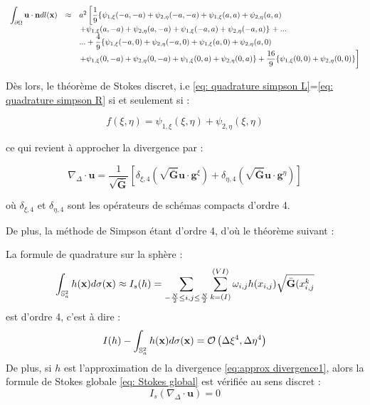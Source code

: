 \begin{equation}
\begin{array}{rcl}
\displaystyle\int_{\partial \Omega} \mathbf{u} \cdot \mathbf{n} dl(\mathbf{x}) & \approx &  a^2 \left[ \dfrac{1}{9} \lbrace  \psi_{1,\xi}(-a,-a)+\psi_{2,\eta}(-a,-a)+\psi_{1,\xi}(a,a)+\psi_{2,\eta}(a,a) \right. \\
& & \left. +\psi_{1,\xi}(a,-a)+\psi_{2,\eta}(a,-a)+\psi_{1,\xi}(-a,a)+\psi_{2,\eta}(-a,a)  \rbrace \right. + ...\\
& & ...+ \dfrac{4}{9} \lbrace  \psi_{1,\xi}(-a,0)+\psi_{2,\eta}(-a,0)+\psi_{1,\xi}(a,0)+\psi_{2,\eta}(a,0) \\
& & \left. +\psi_{1,\xi}(0,-a)+\psi_{2,\eta}(0,-a)+\psi_{1,\xi}(0,a)+\psi_{2,\eta}(0,a)   \rbrace + \dfrac{16}{9} \lbrace \psi_{1,\xi}(0,0)+\psi_{2,\eta}(0,0) \rbrace \right]
\end{array}
\label{eq: quadrature simpson R}
\end{equation}

Dès lors, le théorème de Stokes discret, i.e \eqref{eq: quadrature simpson L}=\eqref{eq: quadrature simpson R} si et seulement si :

\begin{equation}
f(\xi,\eta) = \psi_{1,\xi}(\xi,\eta)+\psi_{2,\eta}(\xi,\eta)
\end{equation}

ce qui revient à approcher la divergence par :

\begin{equation}
\nabla_{\Delta} \cdot \mathbf{u} =\dfrac{1}{\sqrt{\bar{\mathbf{G}}}} \left[ \delta_{\xi,4} \left( \sqrt{\bar{\mathbf{G}}} \mathbf{u} \cdot \mathbf{g}^{\xi} \right) +\delta_{\eta,4} \left( \sqrt{\bar{\mathbf{G}}} \mathbf{u} \cdot \mathbf{g}^{\eta} \right)  \right]
\label{eq:approx divergence1}
\end{equation}

où $\delta_{\xi,4}$ et $\delta_{\eta,4}$ sont les opérateurs de schémas compacts d'ordre 4.

De plus, la méthode de Simpson étant d'ordre 4, d'où le théorème suivant :

\begin{theoreme}
La formule de quadrature sur la sphère :
\begin{equation}
\displaystyle\int_{\mathbb{S}_a^2} h(\mathbf{x}) d\sigma(\mathbf{x}) \approx I_s(h)=\displaystyle\sum\limits_{-\frac{N}{2} \leq i,j \leq \frac{N}{2}} \displaystyle\sum\limits_{k=(I)}^{(VI)} \omega_{i,j} h(x_{i,j})\sqrt{\bar{\mathbf{G}}(x_{i,j}^k}
\label{eq:quadrature simpson}
\end{equation}
est d'ordre 4, c'est à dire :
\begin{equation}
I(h)- \displaystyle\int_{\mathbb{S}_a^2} h(\mathbf{x}) d\sigma(\mathbf{x}) = \mathcal{O}\left( \Delta \xi^4,\Delta \eta^4\right)
\end{equation}
De plus, si $h$ est l'approximation de la divergence \eqref{eq:approx divergence1}, alors la formule de Stokes globale \eqref{eq: Stokes global} est vérifiée au sens discret :
\begin{equation}
I_s(\nabla_{\Delta} \cdot \mathbf{u}) = 0
\label{eq: Stokes global I_s}
\end{equation}
\end{theoreme}

